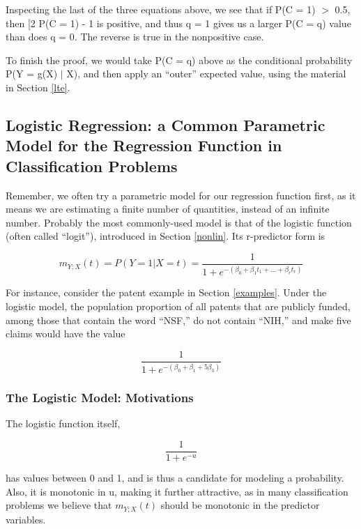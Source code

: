 Inspecting the last of the three equations above, we see that if P(C =
1) $>$ 0.5, then [2 P(C = 1) - 1 is positive, and thus q = 1 gives us a
larger P(C = q) value than does q = 0.  The reverse is true in the
nonpositive case.

To finish the proof, we would take P(C = q) above as the conditional
probability P(Y = g(X) $|$ X), and then apply an ``outer'' expected
value, using the material in Section \ref{lte}.

\subsection{Logistic Regression:  a Common Parametric Model for the
Regression Function in Classification Problems}
\label{logitsec}

Remember, we often try a parametric model for our regression function
first, as it means we are estimating a finite number of quantities,
instead of an infinite number.  Probably the most commonly-used model is
that of the logistic function (often called ``logit''), introduced in
Section \ref{nonlin}.  Its r-predictor form is 

\begin{equation}
\label{logit2}
m_{Y;X}(t) = P(Y = 1 | X = t) = \frac{1}{1+e^{-(\beta_0+\beta_1
t_1+...+\beta_r t_r)}}
\end{equation}

For instance, consider the patent example in Section \ref{examples}.
Under the logistic model, the population proportion of all patents that
are publicly funded, among those that contain the word ``NSF,'' do not
contain ``NIH,'' and make five claims would have the value

\begin{equation}
\frac{1}{1+e^{-(\beta_0 + \beta_1 + 5\beta_3)}}
\end{equation}

\subsubsection{The Logistic Model:  Motivations}
\label{logitmotivations}

The logistic function itself, 

\begin{equation}
\frac{1}{1+e^{-u}}
\end{equation}

has values between 0 and 1, and is thus a candidate for modeling a
probability.  Also, it is monotonic in u, making it further attractive,
as in many classification problems we believe that $m_{Y;X}(t)$ should
be monotonic in the predictor variables.

